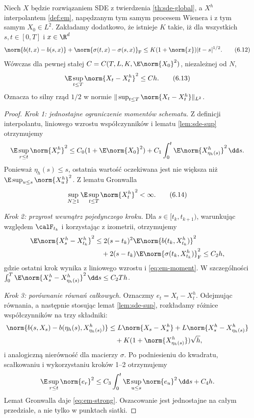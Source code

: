 \begin{twierdzenie}
\label{th:em-rate}
Niech $X$ będzie rozwiązaniem SDE z twierdzenia
\ref{th:sde-global}, a $X^h$ interpolantem
\ref{def:em}, napędzanym tym samym procesem Wienera
i z tym samym $X_0\in L^2$. Zakładamy dodatkowo,
że istnieje $K$ takie, iż dla wszystkich $s,t\in[0,T]$
i $x\in\R^d$
\[
\norm{b(t,x)-b(s,x)}+
\norm{\sigma(t,x)-\sigma(s,x)}_{\mathrm F}
\le K(1+\norm{x})|t-s|^{1/2}.
\tag{6.12}\label{eq:time-holder}
\]
Wówczas dla pewnej stałej $C=C(T,L,K,\E\norm{X_0}^2)$,
niezależnej od $N$,
\[
\E\sup_{t\le T}\norm{X_t-X_t^h}^2\le Ch.
\tag{6.13}\label{eq:em-strong}
\]
Oznacza to silny rząd $1/2$ w normie
$\|\sup_{t\le T}\norm{X_t-X_t^h}\|_{L^2}$.
\end{twierdzenie}
\begin{proof}
\emph{Krok 1: jednostajne ograniczenie momentów schematu.}
Z definicji interpolantu, liniowego wzrostu
współczynników i lematu \ref{lem:sde-sup} otrzymujemy
\[
\E\sup_{r\le t}\norm{X_r^h}^2
\le C_0(1+\E\norm{X_0}^2)
+C_1\int_0^t\E\norm{X^h_{\eta_h(s)}}^2\,\dd s.
\]
Ponieważ $\eta_h(s)\le s$, ostatnia wartość
oczekiwana jest nie większa niż
$\E\sup_{u\le s}\norm{X_u^h}^2$.
Z lematu Gronwalla
\[
\sup_{N\ge1}\E\sup_{t\le T}\norm{X_t^h}^2<\infty.
\tag{6.14}\label{eq:em-moment}
\]

\emph{Krok 2: przyrost wewnątrz pojedynczego kroku.}
Dla $s\in[t_k,t_{k+1})$, warunkując względem
$\calF_{t_k}$ i korzystając z izometrii,
otrzymujemy
\[
\begin{split}
\E\norm{X_s^h-X_{t_k}^h}^2
&\le2(s-t_k)^2\E\norm{b(t_k,X_{t_k}^h)}^2\\
&\quad+2(s-t_k)\E\norm{\sigma(t_k,X_{t_k}^h)}_{\mathrm F}^2
\le C_2h,
\end{split}
\]
gdzie ostatni krok wynika z liniowego wzrostu i
\eqref{eq:em-moment}. W szczególności
$\int_0^T\E\norm{X_s^h-X_{\eta_h(s)}^h}^2\,\dd s
\le C_2Th$.

\emph{Krok 3: porównanie równań całkowych.}
Oznaczmy $e_t=X_t-X_t^h$. Odejmując równania,
a następnie stosując lemat \ref{lem:sde-sup},
rozkładamy różnice współczynników na trzy składniki:
\[
\begin{split}
\norm{b(s,X_s)-b(\eta_h(s),X^h_{\eta_h(s)})}
&\le L\norm{X_s-X_s^h}
+L\norm{X_s^h-X^h_{\eta_h(s)}}\\
&\quad+K(1+\norm{X^h_{\eta_h(s)}})\sqrt h,
\end{split}
\]
i analogiczną nierówność dla macierzy $\sigma$.
Po podniesieniu do kwadratu, scałkowaniu i
wykorzystaniu kroków 1--2 otrzymujemy
\[
\E\sup_{r\le t}\norm{e_r}^2
\le C_3\int_0^t\E\sup_{u\le s}\norm{e_u}^2\,\dd s
+C_4h.
\]
Lemat Gronwalla daje \eqref{eq:em-strong}.
Oszacowanie jest jednostajne na całym przedziale,
a nie tylko w punktach siatki.
\end{proof}


